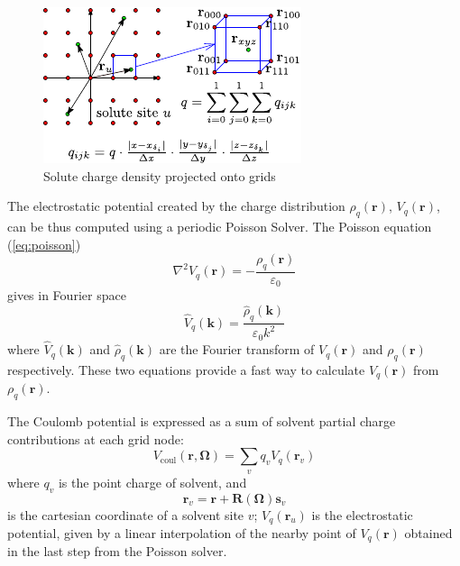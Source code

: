 \begin{figure}[h]
\begin{centering}
\includegraphics[scale=1.5]{_figure/charge_int_2}
\par\end{centering}
\caption{Solute charge density projected onto grids\label{fig:Charge-density-projected}}
\end{figure}

The electrostatic potential created by the charge distribution $\rho_{q}(\mathbf{r})$,
$V_{q}(\mathbf{r})$, can be thus computed using a periodic Poisson
Solver. The Poisson equation (\ref{eq:poisson})
\begin{equation}
\nabla^{2}V_{q}(\mathbf{r})=-\frac{\rho_{q}(\mathbf{r})}{\varepsilon_{0}}
\end{equation}
gives in Fourier space
\begin{equation}
\hat{V}_{q}(\mathbf{k})=\frac{\hat{\rho}_{q}(\mathbf{k})}{\varepsilon_{0}k^{2}}
\end{equation}
where $\hat{V}_{q}(\mathbf{k})$ and $\hat{\rho}_{q}(\mathbf{k})$
are the Fourier transform of $V_{q}(\mathbf{r})$ and $\rho_{q}(\mathbf{r})$
respectively. These two equations provide a fast way to calculate
$V_{q}(\mathbf{r})$ from $\rho_{q}(\mathbf{r})$.

The Coulomb potential is expressed as a sum of solvent partial charge
contributions at each grid node:
\begin{equation}
V_{\mathrm{coul}}(\mathbf{r},\mathbf{\Omega})=\sum_{v}q_{v}V_{q}(\mathbf{r}_{v})
\end{equation}
where $q_{v}$ is the point charge of solvent, and
\begin{equation}
\mathbf{r}_{v}=\mathbf{r}+\mathbf{R}(\mathbf{\Omega})\mathbf{s}_{v}
\end{equation}
is the cartesian coordinate of a solvent site $v$; $V_{q}(\mathbf{r}_{u})$
is the electrostatic potential, given by a linear interpolation of
the nearby point of $V_{q}(\mathbf{r})$ obtained in the last step
from the Poisson solver. 

